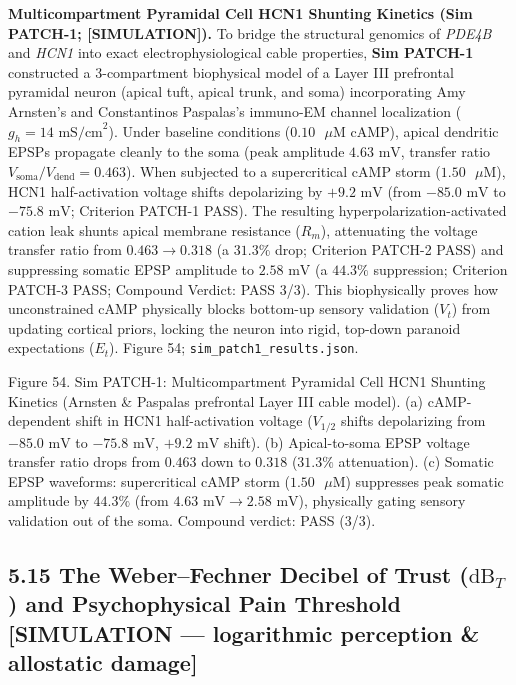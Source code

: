 \documentclass[
]{article}
\begin{document}
\textbf{Multicompartment Pyramidal Cell HCN1 Shunting Kinetics (Sim
PATCH-1; {[}SIMULATION{]}).} To bridge the structural genomics of
\emph{PDE4B} and \emph{HCN1} into exact electrophysiological cable
properties, \textbf{Sim PATCH-1} constructed a 3-compartment biophysical
model of a Layer III prefrontal pyramidal neuron (apical tuft, apical
trunk, and soma) incorporating Amy Arnsten's and Constantinos Paspalas's
immuno-EM channel localization (\(g_h = 14\text{ mS/cm}^2\)). Under
baseline conditions (\(0.10\text{ }\mu\text{M}\) cAMP), apical dendritic
EPSPs propagate cleanly to the soma (peak amplitude \(4.63\text{ mV}\),
transfer ratio \(V_{\mathrm{soma}} / V_{\mathrm{dend}} = 0.463\)). When
subjected to a supercritical cAMP storm (\(1.50\text{ }\mu\text{M}\)),
HCN1 half-activation voltage shifts depolarizing by \(+9.2\text{ mV}\)
(from \(-85.0\text{ mV}\) to \(-75.8\text{ mV}\); Criterion PATCH-1
PASS). The resulting hyperpolarization-activated cation leak shunts
apical membrane resistance (\(R_m\)), attenuating the voltage transfer
ratio from \(0.463 \to 0.318\) (a \(31.3\%\) drop; Criterion PATCH-2
PASS) and suppressing somatic EPSP amplitude to \(2.58\text{ mV}\) (a
\(44.3\%\) suppression; Criterion PATCH-3 PASS; Compound Verdict: PASS
3/3). This biophysically proves how unconstrained cAMP physically blocks
bottom-up sensory validation (\(V_t\)) from updating cortical priors,
locking the neuron into rigid, top-down paranoid expectations (\(E_t\)).
Figure 54; \texttt{sim\_patch1\_results.json}.

Figure 54. Sim PATCH-1: Multicompartment Pyramidal Cell HCN1 Shunting
Kinetics (Arnsten \& Paspalas prefrontal Layer III cable model). (a)
cAMP-dependent shift in HCN1 half-activation voltage (\(V_{1/2}\) shifts
depolarizing from \(-85.0\text{ mV}\) to \(-75.8\text{ mV}\),
\(+9.2\text{ mV}\) shift). (b) Apical-to-soma EPSP voltage transfer
ratio drops from \(0.463\) down to \(0.318\) (\(31.3\%\) attenuation).
(c) Somatic EPSP waveforms: supercritical cAMP storm
(\(1.50\text{ }\mu\text{M}\)) suppresses peak somatic amplitude by
\(44.3\%\) (from \(4.63\text{ mV} \to 2.58\text{ mV}\)), physically
gating sensory validation out of the soma. Compound verdict: PASS (3/3).

\subsection{\texorpdfstring{5.15 The Weber--Fechner Decibel of Trust
(\(\text{dB}_T\)) and Psychophysical Pain Threshold {[}SIMULATION ---
logarithmic perception \& allostatic
damage{]}}{5.15 The Weber--Fechner Decibel of Trust (\textbackslash text\{dB\}\_T) and Psychophysical Pain Threshold {[}SIMULATION --- logarithmic perception \& allostatic damage{]}}}\label{the-weberfechner-decibel-of-trust-textdb_t-and-psychophysical-pain-threshold-simulation-logarithmic-perception-allostatic-damage}
\end{document}
